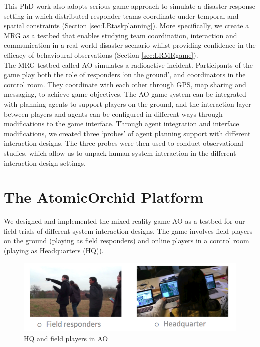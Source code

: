 This PhD work also adopts serious game approach to simulate a disaster response setting in which distributed responder teams coordinate under temporal and spatial constraints (Section \ref{sec:LRtaskplanning}). More specifically, we create a \acf{MRG} as a testbed that enables studying team coordination, interaction and communication in a real-world disaster scenario whilst providing confidence in the efficacy of behavioural observations (Section \ref{sec:LRMRgame}).\\

The \ac{MRG} testbed called \acf{AO} simulates a radioactive incident. Participants of the game play both the role of responders `on the ground', and coordinators in the control room. They coordinate with each other through GPS, map sharing and messaging, to achieve game objectives. The \ac{AO} game system can be integrated with planning agents to support players on the ground, and the interaction layer between players and agents can be configured in different ways through modifications to the game interface. Through agent integration and interface modifications, we created three `probes' of agent planning support with different interaction designs. The three probes were then used to conduct observational studies, which allow us to unpack human system interaction in the different interaction design settings.\\

\section{The AtomicOrchid Platform}\label{sec:AOdescription}
We designed and implemented the mixed reality game \acf{AO} as a testbed for our field trials of different system interaction designs. The game involves field players on the ground (playing as field responders) and online players in a control room (playing as Headquarters (HQ)).

\begin{figure}[h]
  \centering
  \includegraphics[width=1\textwidth]{img/approach/GameComponents}
  \caption{HQ and field players in AO}
  \label{fig:AOroles}
\end{figure}

